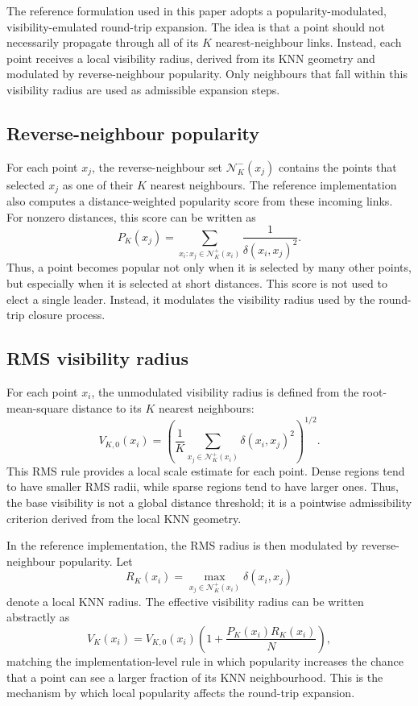 \documentclass[pdflatex,sn-mathphys-num]{sn-jnl}
\newcommand{\calN}{\mathcal{N}}
\begin{document}
The reference formulation used in this paper adopts a popularity-modulated, visibility-emulated round-trip expansion. The idea is that a point should not necessarily propagate through all of its $K$ nearest-neighbour links. Instead, each point receives a local visibility radius, derived from its KNN geometry and modulated by reverse-neighbour popularity. Only neighbours that fall within this visibility radius are used as admissible expansion steps.

\subsection{Reverse-neighbour popularity}

For each point $x_j$, the reverse-neighbour set $\calN_K^-(x_j)$ contains the points that selected $x_j$ as one of their $K$ nearest neighbours. The reference implementation also computes a distance-weighted popularity score from these incoming links. For nonzero distances, this score can be written as
\begin{equation}
P_K(x_j)=
\sum_{x_i: x_j\in\calN_K^+(x_i)}
\frac{1}{\delta(x_i,x_j)^2}.
\label{eq:reverse_popularity}
\end{equation}
Thus, a point becomes popular not only when it is selected by many other points, but especially when it is selected at short distances. This score is not used to elect a single leader. Instead, it modulates the visibility radius used by the round-trip closure process.

\subsection{RMS visibility radius}

For each point $x_i$, the unmodulated visibility radius is defined from the root-mean-square distance to its $K$ nearest neighbours:
\begin{equation}
V_{K,0}(x_i)=
\left(
\frac{1}{K}
\sum_{x_j\in\calN_K^+(x_i)}
\delta(x_i,x_j)^2
\right)^{1/2}.
\label{eq:rms_visibility_base}
\end{equation}
This RMS rule provides a local scale estimate for each point. Dense regions tend to have smaller RMS radii, while sparse regions tend to have larger ones. Thus, the base visibility is not a global distance threshold; it is a pointwise admissibility criterion derived from the local KNN geometry.

In the reference implementation, the RMS radius is then modulated by reverse-neighbour popularity. Let
\begin{equation}
R_K(x_i)=\max_{x_j\in\calN_K^+(x_i)}\delta(x_i,x_j)
\end{equation}
denote a local KNN radius. The effective visibility radius can be written abstractly as
\begin{equation}
V_K(x_i)=V_{K,0}(x_i)
\left(1+\frac{P_K(x_i)R_K(x_i)}{N}\right),
\label{eq:popularity_modulated_visibility}
\end{equation}
matching the implementation-level rule in which popularity increases the chance that a point can see a larger fraction of its KNN neighbourhood. This is the mechanism by which local popularity affects the round-trip expansion.
\end{document}
